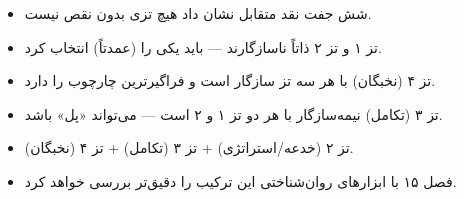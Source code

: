 \begin{principleBox}
\begin{itemize}[label=\textcolor{cPrimary}{$\blacksquare$}, rightmargin=2em]
    \item شش جفت نقد متقابل نشان داد هیچ تزی بدون نقص نیست.
    \item تز ۱ و تز ۲ ذاتاً ناسازگارند — باید یکی را (عمدتاً) انتخاب کرد.
    \item تز ۴ (نخبگان) با هر سه تز سازگار است و فراگیرترین چارچوب را دارد.
    \item تز ۳ (تکامل) نیمه‌سازگار با هر دو تز ۱ و ۲ است — می‌تواند «پل» باشد.
    \item {} تز ۲ (خدعه/استراتژی) + تز ۳ (تکامل) + تز ۴ (نخبگان).
    \item فصل ۱۵ با ابزارهای روان‌شناختی این ترکیب را دقیق‌تر بررسی خواهد کرد.
\end{itemize}
\end{principleBox}